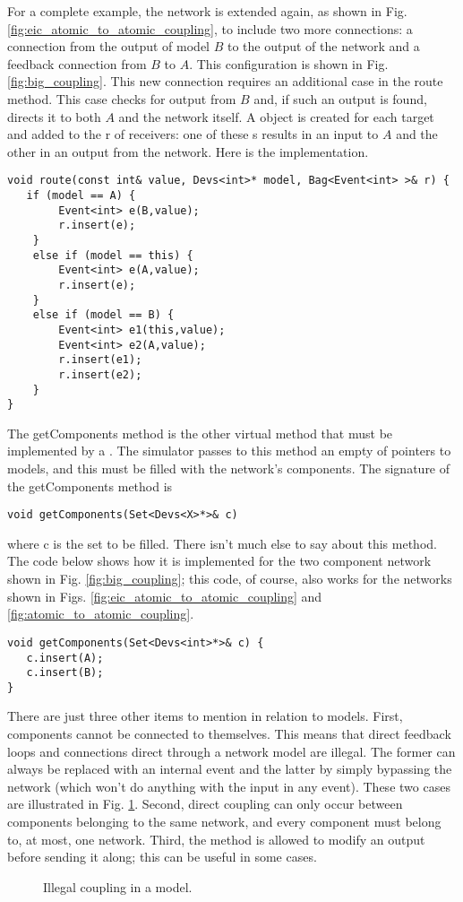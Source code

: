 For a complete example, the network is extended again, as shown in Fig. \ref{fig:eic_atomic_to_atomic_coupling}, to include two more connections: a connection from the output of model $B$ to the output of the network and a feedback connection from $B$ to $A$. This configuration is shown in Fig. \ref{fig:big_coupling}. This new connection requires an additional case in the route method. This case checks for output from $B$ and, if such an output is found, directs it to both $A$ and the network itself. A  object is created for each target and added to the  r of receivers: one of these s results in an input to $A$ and the other in an output from the network. Here is the implementation.
\begin{verbatim}
void route(const int& value, Devs<int>* model, Bag<Event<int> >& r) {
   if (model == A) {
        Event<int> e(B,value);
        r.insert(e);
    }
    else if (model == this) {
        Event<int> e(A,value);
        r.insert(e);
    }
    else if (model == B) {
        Event<int> e1(this,value);
        Event<int> e2(A,value);
        r.insert(e1);
        r.insert(e2);
    }
}
\end{verbatim}

The getComponents method is the other virtual method that must be implemented by a . The simulator passes to this method an empty  of pointers to models, and this must be filled with the network's components. The signature of the getComponents method is
\begin{verbatim}
void getComponents(Set<Devs<X>*>& c) 
\end{verbatim}
where c is the set to be filled. There isn't much else to say about this method. The code below shows how it is implemented for the two component network shown in Fig. \ref{fig:big_coupling}; this code, of course, also works for the networks shown in Figs. \ref{fig:eic_atomic_to_atomic_coupling} and \ref{fig:atomic_to_atomic_coupling}.
\begin{verbatim}
void getComponents(Set<Devs<int>*>& c) { 
   c.insert(A);
   c.insert(B);
}
\end{verbatim}

There are just three other items to mention in relation to  models. First, components cannot be connected to themselves. This means that direct feedback loops and connections direct through a network model are illegal. The former can always be replaced with an internal event and the latter by simply bypassing the network (which won't do anything with the input in any event). These two cases are illustrated in Fig. \ref{fig:bad_coupling}. Second, direct coupling can only occur between components belonging to the same network, and every component must belong to, at most, one network. Third, the  method is allowed to modify an output before sending it along; this can be useful in some cases.
\begin{figure}[ht]
\centering
{}
\caption{Illegal coupling in a  model.}
\label{fig:bad_coupling}
\end{figure}

